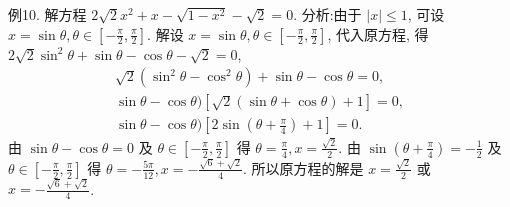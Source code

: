 例10. 解方程 $2 \sqrt{2} x^2+x-\sqrt{1-x^2}-\sqrt{2}=0$.
分析:由于 $|x| \leqslant 1$, 可设 $x=\sin \theta, \theta \in\left[-\frac{\pi}{2}, \frac{\pi}{2}\right]$.
解设 $x=\sin \theta, \theta \in\left[-\frac{\pi}{2}, \frac{\pi}{2}\right]$, 代入原方程, 得 $2 \sqrt{2} \sin ^2 \theta+\sin \theta- \cos \theta-\sqrt{2}=0$,
$$
\begin{gathered}
\sqrt{2}\left(\sin ^2 \theta-\cos ^2 \theta\right)+\sin \theta-\cos \theta=0, \\
\sin \theta-\cos \theta)[\sqrt{2}(\sin \theta+\cos \theta)+1]=0, \\
\sin \theta-\cos \theta)\left[2 \sin \left(\theta+\frac{\pi}{4}\right)+1\right]=0 .
\end{gathered}
$$
由 $\sin \theta-\cos \theta=0$ 及 $\theta \in\left[-\frac{\pi}{2}, \frac{\pi}{2}\right]$ 得 $\theta=\frac{\pi}{4}, x=\frac{\sqrt{2}}{2}$.
由 $\sin \left(\theta+\frac{\pi}{4}\right)=-\frac{1}{2}$ 及 $\theta \in\left[-\frac{\pi}{2}, \frac{\pi}{2}\right]$ 得 $\theta=-\frac{5 \pi}{12}, x=-\frac{\sqrt{6}+\sqrt{2}}{4}$.
所以原方程的解是 $x=\frac{\sqrt{2}}{2}$ 或 $x=-\frac{\sqrt{6}+\sqrt{2}}{4}$.



